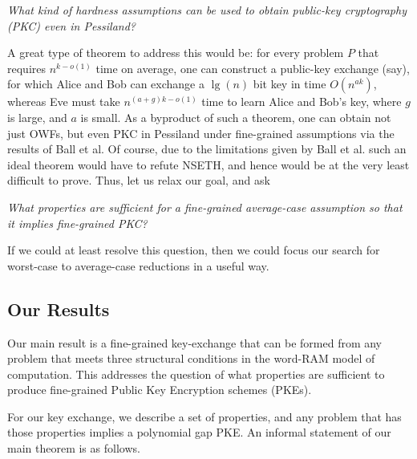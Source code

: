 \begin{center}{\em What kind of hardness assumptions can be used to obtain public-key cryptography (PKC) even in Pessiland?}\end{center} 

A great type of theorem to address this would be: for every problem $P$ that requires $n^{k-o(1)}$ time on average, one can construct a public-key exchange (say), for which Alice and Bob can exchange a $\lg(n)$ bit key in time $O(n^{ak})$, whereas Eve must take $n^{(a+g)k-o(1)}$ time to learn Alice and Bob's key, where $g$ is large, and $a$ is small. As a byproduct of such a theorem, one can obtain not just OWFs, but even PKC in Pessiland under fine-grained assumptions via the results of Ball et al. Of course, due to the limitations given by Ball et al. such an ideal theorem would have to refute NSETH, and hence would be at the very least difficult to prove.
Thus, let us relax our goal, and ask 
\begin{center}{\em What properties are sufficient for a fine-grained average-case assumption so that it implies fine-grained PKC?}\end{center} 

If we could at least resolve this question, then we could focus our search for worst-case to average-case reductions in a useful way.





\subsection{Our Results}
Our main result is a fine-grained key-exchange that can be formed from any problem that meets three structural conditions in the word-RAM model of computation. This addresses the question of what properties are sufficient to produce fine-grained Public Key Encryption schemes (PKEs).

For our key exchange, we describe a set of properties, and any problem that has those properties implies a polynomial gap PKE. An informal statement of our main theorem is as follows.\\


